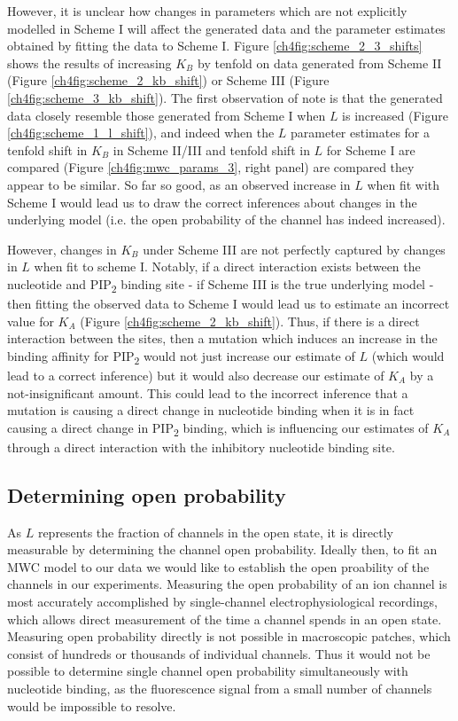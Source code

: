 However, it is unclear how changes in parameters which are not explicitly modelled in Scheme I will affect the generated data and the parameter estimates obtained by fitting the data to Scheme I.
Figure \ref{ch4fig:scheme_2_3_shifts} shows the results of increasing $K_B$ by tenfold on data generated from Scheme II (Figure \ref{ch4fig:scheme_2_kb_shift}) or Scheme III (Figure \ref{ch4fig:scheme_3_kb_shift}).
The first observation of note is that the generated data closely resemble those generated from Scheme I when $L$ is increased (Figure \ref{ch4fig:scheme_1_l_shift}), and indeed when the $L$ parameter estimates for a tenfold shift in $K_B$ in Scheme II/III and tenfold shift in $L$ for Scheme I are compared (Figure \ref{ch4fig:mwc_params_3}, right panel) are compared they appear to be similar.
So far so good, as an observed increase in $L$ when fit with Scheme I would lead us to draw the correct inferences about changes in the underlying model (i.e. the open probability of the channel has indeed increased).

However, changes in $K_B$ under Scheme III are not perfectly captured by changes in $L$ when fit to scheme I.
Notably, if a direct interaction exists between the nucleotide and PIP\textsubscript{2} binding site - if Scheme III is the true underlying model - then fitting the observed data to Scheme I would lead us to estimate an incorrect value for $K_A$ (Figure \ref{ch4fig:scheme_2_kb_shift}).
Thus, if there is a direct interaction between the sites, then a mutation which induces an increase in the binding affinity for PIP\textsubscript{2} would not just increase our estimate of $L$ (which would lead to a correct inference) but it would also decrease our estimate of $K_A$ by a not-insignificant amount.
This could lead to the incorrect inference that a mutation is causing a direct change in nucleotide binding when it is in fact causing a direct change in PIP\textsubscript{2} binding, which is influencing our estimates of $K_A$ through a direct interaction with the inhibitory nucleotide binding site.

\subsection{Determining open probability}

As $L$ represents the fraction of channels in the open state, it is directly measurable by determining the channel open probability.
Ideally then, to fit an MWC model to our data we would like to establish the open proability of the channels in our experiments.
Measuring the open probability of an ion channel is most accurately accomplished by single-channel electrophysiological recordings, which allows direct measurement of the time a channel spends in an open state.
Measuring open probability directly is not possible in macroscopic patches, which consist of hundreds or thousands of individual channels.
Thus it would not be possible to determine single channel open probability simultaneously with nucleotide binding, as the fluorescence signal from a small number of channels would be impossible to resolve.

